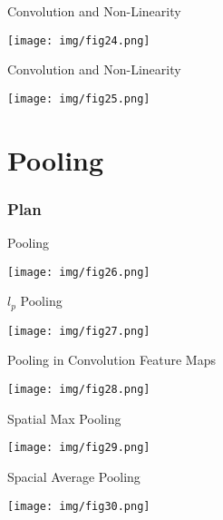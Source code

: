 \documentclass[9pt]{beamer}
\begin{document}
\begin{frame}{Convolution and Non-Linearity}
\begin{center}
	\texttt{[image: img/fig24.png]} 
\end{center}
\end{frame}

\begin{frame}{Convolution and Non-Linearity}
\begin{center}
	\texttt{[image: img/fig25.png]} 
\end{center}
\end{frame}

	
\section{Pooling}

    \begin{frame}
   	 	\frametitle{Plan}
    		\tableofcontents[currentsection]
	\end{frame}
	
\begin{frame}{Pooling}
\begin{center}
	\texttt{[image: img/fig26.png]} 
\end{center}
\end{frame}

\begin{frame}$l_p$ {Pooling}
\begin{center}
	\texttt{[image: img/fig27.png]} 
\end{center}
\end{frame}

\begin{frame}{Pooling in Convolution Feature Maps}
\begin{center}
	\texttt{[image: img/fig28.png]} 
\end{center}
\end{frame}

\begin{frame}{Spatial Max Pooling}
\begin{center}
	\texttt{[image: img/fig29.png]} 
\end{center}
\end{frame}

\begin{frame}{Spacial Average Pooling}
\begin{center}
	\texttt{[image: img/fig30.png]} 
\end{center}
\end{frame}
\end{document}
